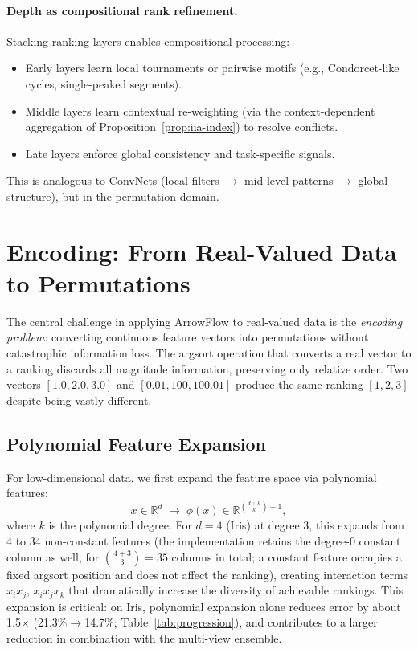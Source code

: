 \documentclass[12pt]{article}
\newcommand{\R}{\mathbb{R}}
\begin{document}
\paragraph{Depth as compositional rank refinement.}
Stacking ranking layers enables compositional processing:
\begin{itemize}[leftmargin=2em]
  \item Early layers learn local tournaments or pairwise motifs (e.g., Condorcet-like cycles, single-peaked segments).
  \item Middle layers learn contextual re-weighting (via the context-dependent aggregation of Proposition~\ref{prop:iia-index}) to resolve conflicts.
  \item Late layers enforce global consistency and task-specific signals.
\end{itemize}
This is analogous to ConvNets (local filters $\to$ mid-level patterns $\to$ global structure), but in the permutation domain.


\section{Encoding: From Real-Valued Data to Permutations}
\label{sec:encoding}

The central challenge in applying ArrowFlow to real-valued data is the \emph{encoding problem}: converting continuous feature vectors into permutations without catastrophic information loss. The argsort operation that converts a real vector to a ranking discards all magnitude information, preserving only relative order. Two vectors $[1.0, 2.0, 3.0]$ and $[0.01, 100, 100.01]$ produce the same ranking $[1, 2, 3]$ despite being vastly different.

\subsection{Polynomial Feature Expansion}
For low-dimensional data, we first expand the feature space via polynomial features:
\begin{equation}
x \in \R^d \;\mapsto\; \phi(x) \in \R^{\binom{d+k}{k}-1},
\end{equation}
where $k$ is the polynomial degree. For $d = 4$ (Iris) at degree 3, this expands from 4 to 34 non-constant features (the implementation retains the degree-0 constant column as well, for $\binom{4+3}{3}=35$ columns in total; a constant feature occupies a fixed argsort position and does not affect the ranking), creating interaction terms $x_i x_j$, $x_i x_j x_k$ that dramatically increase the diversity of achievable rankings. This expansion is critical: on Iris, polynomial expansion alone reduces error by about 1.5$\times$ (21.3\%$\to$14.7\%; Table~\ref{tab:progression}), and contributes to a larger reduction in combination with the multi-view ensemble.
\end{document}
